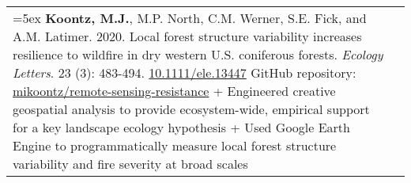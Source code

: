 \begin{longtable}{@{} >{\raggedright}p{6.10in} >{\raggedleft}X @{}}
\hangindent=5ex \textbf{Koontz, M.J.}, M.P. North, C.M. Werner, S.E. Fick, and A.M. Latimer. 2020. Local forest structure variability increases resilience to wildfire in dry western U.S. coniferous forests. \emph{Ecology Letters}. 23 (3): 483-494. \href{https://doi.org/10.1111/ele.13447}{10.1111/ele.13447} 
\newline GitHub repository: \href{https://github.com/mikoontz/remote-sensing-resistance}{mikoontz/remote-sensing-resistance}
\newline + Engineered creative geospatial analysis to provide ecosystem-wide, empirical support for a key landscape ecology hypothesis
\newline + Used Google Earth Engine to programmatically measure local forest structure variability and fire severity at broad scales & \tabularnewline

\end{longtable}